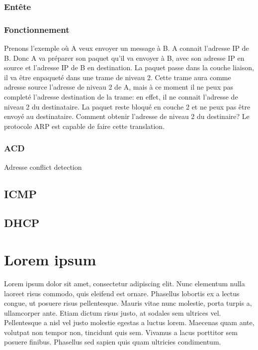 \documentclass[twoside,openright,a4paper,11pt,french]{article}
\begin{document}
\subsubsection{Entête}

\subsubsection{Fonctionnement}
Prenons l'exemple où A veux envoyer un message à B. A connait l'adresse IP de
B. Donc A va préparer son paquet qu'il va envoyer à B, avec son adresse IP en
source et l'adresse IP de B en destination. La paquet passe dans la couche
liaison, il va être enpaqueté dans une trame de niveau 2. Cette trame aura
comme adresse source l'adresse de niveau 2 de A, mais à ce moment il ne peux
pas completé l'adresse destination de la trame: en effet, il ne connait
l'adresse de niveau 2 du destinataire. La paquet reste bloqué en couche 2 et ne
peux pas être envoyé au destinataire. Comment obtenir l'adresse de niveau 2 du destinaire?
Le protocole ARP est capable de faire cette translation.

\subsubsection{ACD}
Adresse conflict detection
\subsection{ICMP}
\subsection{DHCP}







\section{Lorem ipsum}

Lorem ipsum dolor sit amet, consectetur adipiscing elit. Nunc elementum nulla laoreet risus commodo, quis eleifend est ornare. Phasellus lobortis ex a lectus congue, ut posuere risus pellentesque. Mauris vitae nunc molestie, porta turpis a, ullamcorper ante. Etiam dictum risus justo, at sodales sem ultrices vel. Pellentesque a nisl vel justo molestie egestas a luctus lorem. Maecenas quam ante, volutpat non tempor non, tincidunt quis sem. Vivamus a lacus porttitor sem posuere finibus. Phasellus sed sapien quis quam ultricies condimentum.
\end{document}
